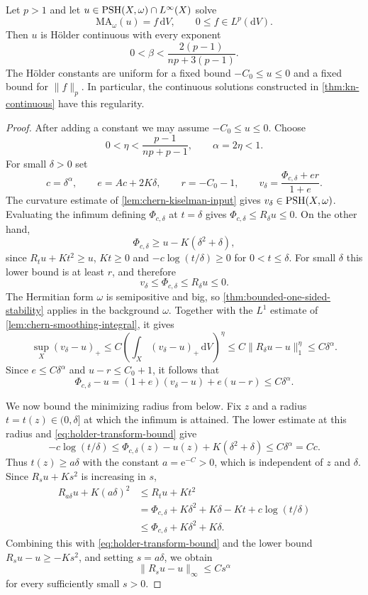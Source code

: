 \begin{theorem}\label{thm:hermitian-holder-elementary}
Let $p>1$ and let $u\in\mathrm{PSH}(X,\omega)\cap L^\infty(X)$ solve
\[
 \mathrm{MA}_\omega(u)=f\,\mathrm{d}V,\qquad 0\leq f\in L^p(\mathrm{d}V).
\]
Then $u$ is H\"older continuous with every exponent
\[
 0<\beta<\frac{2(p-1)}{np+3(p-1)}.
\]
The H\"older constants are uniform for a fixed bound $-C_0\leq u\leq0$ and a fixed bound for $\|f\|_p$. In particular, the continuous solutions constructed in \cref{thm:kn-continuous} have this regularity.
\end{theorem}
\begin{proof}
After adding a constant we may assume $-C_0\leq u\leq0$. Choose
\[
 0<\eta<\frac{p-1}{np+p-1},\qquad \alpha=2\eta<1.
\]
For small $\delta>0$ set
\[
 c=\delta^\alpha,\qquad e=Ac+2K\delta,\qquad
 r=-C_0-1,\qquad
 v_\delta=\frac{\Phi_{c,\delta}+er}{1+e}.
\]
The curvature estimate of \cref{lem:chern-kiselman-input} gives $v_\delta\in\mathrm{PSH}(X,\omega)$. Evaluating the infimum defining $\Phi_{c,\delta}$ at $t=\delta$ gives $\Phi_{c,\delta}\leq R_\delta u\leq0$. On the other hand,
\[
 \Phi_{c,\delta}\geq u-K(\delta^2+\delta),
\]
since $R_tu+Kt^2\geq u$, $Kt\geq0$ and $-c\log(t/\delta)\geq0$ for $0<t\leq\delta$. For small $\delta$ this lower bound is at least $r$, and therefore
\[
 v_\delta\leq\Phi_{c,\delta}\leq R_\delta u\leq0.
\]
The Hermitian form $\omega$ is semipositive and big, so \cref{thm:bounded-one-sided-stability} applies in the background $\omega$. Together with the $L^1$ estimate of \cref{lem:chern-smoothing-integral}, it gives
\[
 \sup_X(v_\delta-u)_+
 \leq C\left(\int_X(v_\delta-u)_+\,\mathrm{d}V\right)^\eta
 \leq C\|R_\delta u-u\|_1^\eta\leq C\delta^\alpha.
\]
Since $e\leq C\delta^\alpha$ and $u-r\leq C_0+1$, it follows that
\begin{equation}\label{eq:holder-transform-bound}
 \Phi_{c,\delta}-u
   =(1+e)(v_\delta-u)+e(u-r)\leq C\delta^\alpha.
\end{equation}

We now bound the minimizing radius from below. Fix $z$ and a radius $t=t(z)\in(0,\delta]$ at which the infimum is attained. The lower estimate at this radius and \eqref{eq:holder-transform-bound} give
\[
 -c\log(t/\delta)
 \leq\Phi_{c,\delta}(z)-u(z)+K(\delta^2+\delta)
 \leq C\delta^\alpha=Cc.
\]
Thus $t(z)\geq a\delta$ with the constant $a=\mathrm{e}^{-C}>0$, which is independent of $z$ and $\delta$. Since $R_su+Ks^2$ is increasing in $s$,
\[
 \begin{split}
 R_{a\delta}u+K(a\delta)^2
 &\leq R_tu+Kt^2\\
 &=\Phi_{c,\delta}+K\delta^2+K\delta-Kt+c\log(t/\delta)\\
 &\leq\Phi_{c,\delta}+K\delta^2+K\delta.
 \end{split}
\]
Combining this with \eqref{eq:holder-transform-bound} and the lower bound $R_su-u\geq-Ks^2$, and setting $s=a\delta$, we obtain
\[
 \|R_su-u\|_\infty\leq Cs^\alpha
\]
for every sufficiently small $s>0$.


\end{proof}
